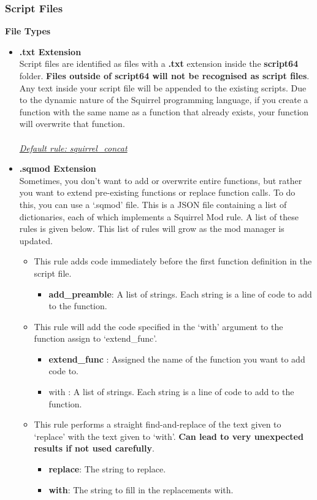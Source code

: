 \documentclass{article}
\begin{document}
\subsubsection{Script Files}
\textbf{File Types}
\begin{itemize}
\item \textbf{.txt Extension}\\
Script files are identified as files with a \textbf{.txt} extension inside the \textbf{script64} folder. \textbf{Files outside of script64 will not be recognised as script files}. Any text inside your script file will be appended to the existing scripts. Due to the dynamic nature of the Squirrel programming language, if you create a function with the same name as a function that already exists, your function will overwrite that function.\\\\
\underline{\textit{Default rule: squirrel\_concat}}

\item \textbf{.sqmod Extension}\\
Sometimes, you don't want to add or overwrite entire functions, but rather you want to extend pre-existing functions or replace function calls. To do this, you can use a `.sqmod' file. This is a JSON file containing a list of dictionaries, each of which implements a Squirrel Mod rule. A list of these rules is given below. This list of rules will grow as the mod manager is updated.
\begin{itemize}
\item This rule adds code immediately before the first function definition in the script file.
\begin{itemize}
\item \textbf{add\_preamble}: A list of strings. Each string is a line of code to add to the function.
\end{itemize}

\item This rule will add the code specified in the `with' argument to the function assign to `extend\_func'.
\begin{itemize}
\item \textbf{extend\_func} : Assigned the name of the function you want to add code to.
\item with : A list of strings. Each string is a line of code to add to the function.
\end{itemize}

\item This rule performs a straight find-and-replace of the text given to `replace' with the text given to `with'. \textbf{Can lead to very unexpected results if not used carefully}.
\begin{itemize}
\item \textbf{replace}: The string to replace.
\item \textbf{with}: The string to fill in the replacements with.
\end{itemize}


\end{itemize}
\end{itemize}
\end{document}
